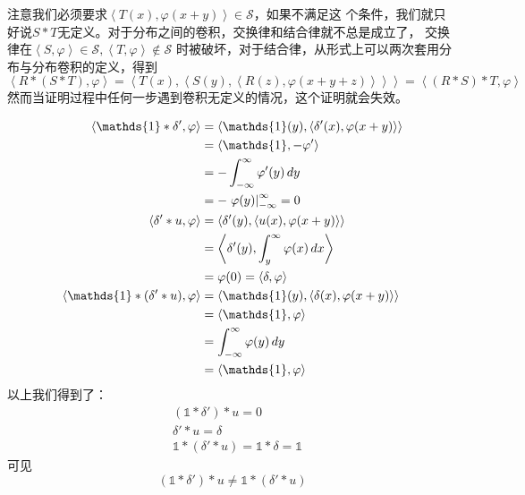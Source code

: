 注意我们必须要求$\left\langle T(x),\varphi(x+y)\right\rangle\in\mathcal{S}$，如果不满足这
个条件，我们就只好说$S*T$无定义。对于分布之间的卷积，交换律和结合律就不总是成立了，
交换律在$\left\langle S,\varphi\right\rangle\in\mathcal{S} ,\left\langle T,\varphi\right\rangle\notin\mathcal{S}$
时被破坏，对于结合律，从形式上可以两次套用分布与分布卷积的定义，得到
\begin{equation*}
    \left\langle R*(S*T),\varphi\right\rangle=\left\langle T(x),\left\langle S(y),\left\langle R(z),\varphi(x+y+z)\right\rangle\right\rangle\right\rangle=\left\langle (R*S)*T,\varphi\right\rangle
\end{equation*}
然而当证明过程中任何一步遇到卷积无定义的情况，这个证明就会失效。
\begin{example}[结合律的失效]\label{exmp:associative_loss}
\begin{align*}
    \left\langle\mathds{1}*\delta',\varphi\right\rangle& =\left\langle \mathds{1}(y),\left\langle \delta'(x),\varphi(x+y)\right\rangle\right\rangle\\
    &=\left\langle \mathds{1},-\varphi'\right\rangle\\
    &=-\int_{-\infty}^{\infty}\varphi'(y)\,dy\\
    &=-\evalat{\varphi(y)}{-\infty}{\infty}=0\\
    \left\langle \delta'*u,\varphi\right\rangle&=\left\langle \delta'(y),\left\langle u(x),\varphi(x+y)\right\rangle\right\rangle\\
    &=\left\langle \delta'(y),\int_{y}^{\infty}\varphi(x)\,dx\right\rangle\\
    &=\varphi(0)=\left\langle \delta,\varphi\right\rangle\\
    \left\langle\mathds{1}*(\delta'*u),\varphi\right\rangle&=\left\langle \mathds{1}(y),\left\langle \delta(x),\varphi(x+y)\right\rangle\right\rangle\\
    &=\left\langle \mathds{1},\varphi\right\rangle\\
    &=\int_{-\infty}^{\infty}\varphi(y)\,dy\\
    & =\left\langle \mathds{1},\varphi\right\rangle 
\end{align*}
以上我们得到了：\begin{align*}
    &(\mathds{1}*\delta')*u=0\\
    &\delta'*u=\delta\\
    &\mathds{1}*(\delta'*u)=\mathds{1}*\delta=\mathds{1}
\end{align*}
可见\begin{equation*}
    (\mathds{1}*\delta')*u                       \neq\mathds{1}*(\delta'*u)
\end{equation*}
\end{example}

